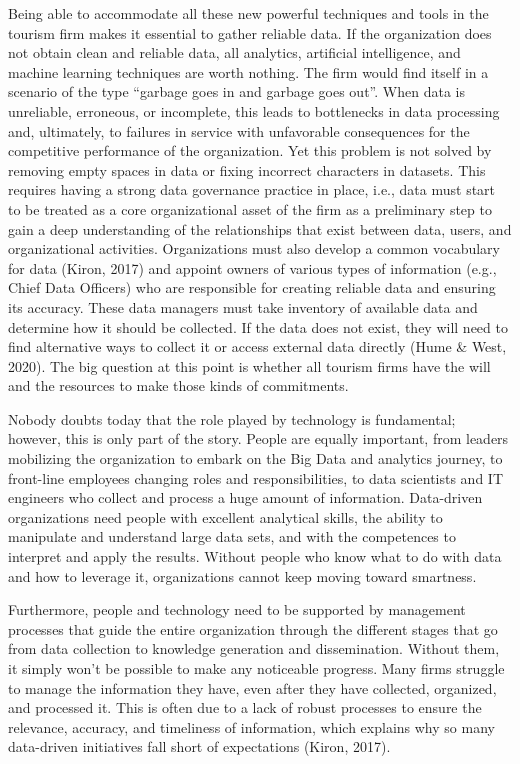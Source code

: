 \documentclass[
  letterpaper,
  DIV=11,
  numbers=noendperiod]{scrreprt}
\begin{document}
Being able to accommodate all these new powerful techniques and tools in
the tourism firm makes it essential to gather reliable data. If the
organization does not obtain clean and reliable data, all analytics,
artificial intelligence, and machine learning techniques are worth
nothing. The firm would find itself in a scenario of the type ``garbage
goes in and garbage goes out''. When data is unreliable, erroneous, or
incomplete, this leads to bottlenecks in data processing and,
ultimately, to failures in service with unfavorable consequences for the
competitive performance of the organization. Yet this problem is not
solved by removing empty spaces in data or fixing incorrect characters
in datasets. This requires having a strong data governance practice in
place, i.e., data must start to be treated as a core organizational
asset of the firm as a preliminary step to gain a deep understanding of
the relationships that exist between data, users, and organizational
activities. Organizations must also develop a common vocabulary for data
(Kiron, 2017) and appoint owners of various types of information (e.g.,
Chief Data Officers) who are responsible for creating reliable data and
ensuring its accuracy. These data managers must take inventory of
available data and determine how it should be collected. If the data
does not exist, they will need to find alternative ways to collect it or
access external data directly (Hume \& West, 2020). The big question at
this point is whether all tourism firms have the will and the resources
to make those kinds of commitments.

Nobody doubts today that the role played by technology is fundamental;
however, this is only part of the story. People are equally important,
from leaders mobilizing the organization to embark on the Big Data and
analytics journey, to front-line employees changing roles and
responsibilities, to data scientists and IT engineers who collect and
process a huge amount of information. Data-driven organizations need
people with excellent analytical skills, the ability to manipulate and
understand large data sets, and with the competences to interpret and
apply the results. Without people who know what to do with data and how
to leverage it, organizations cannot keep moving toward smartness.

Furthermore, people and technology need to be supported by management
processes that guide the entire organization through the different
stages that go from data collection to knowledge generation and
dissemination. Without them, it simply won't be possible to make any
noticeable progress. Many firms struggle to manage the information they
have, even after they have collected, organized, and processed it. This
is often due to a lack of robust processes to ensure the relevance,
accuracy, and timeliness of information, which explains why so many
data-driven initiatives fall short of expectations (Kiron, 2017).
\end{document}

